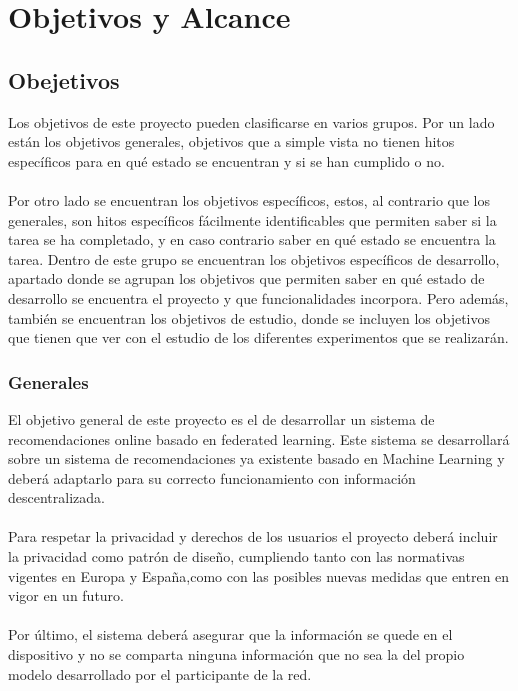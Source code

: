 \chapter{Objetivos y Alcance}
\thispagestyle{fancy}
\section{Obejetivos}
Los objetivos de este proyecto pueden clasificarse en varios grupos. Por un lado están los objetivos generales, objetivos que a simple vista no tienen hitos específicos para en qué estado se encuentran y si se han cumplido o no.
\\\\
Por otro lado se encuentran los objetivos específicos, estos, al contrario que los generales, son hitos específicos fácilmente identificables que permiten saber si la tarea se ha completado, y en caso contrario saber en qué estado se encuentra la tarea. Dentro de este grupo se encuentran los objetivos específicos de desarrollo, apartado donde se agrupan los objetivos que permiten saber en qué estado de desarrollo se encuentra el proyecto y que funcionalidades incorpora. Pero además, también se encuentran los objetivos de estudio, donde se incluyen los objetivos que tienen que ver con el estudio de los diferentes experimentos que se realizarán. 

\subsection{Generales}
El objetivo general de este proyecto es el de desarrollar un sistema de recomendaciones online basado en federated learning. Este sistema se desarrollará sobre un sistema de recomendaciones ya existente basado en Machine Learning y deberá adaptarlo para su correcto funcionamiento con información descentralizada.
\\ \\
Para respetar la privacidad y derechos de los usuarios el proyecto deberá incluir la privacidad como patrón de diseño, cumpliendo tanto con las normativas vigentes en Europa y España,como con las posibles nuevas medidas que entren en vigor en un futuro. 
\\ \\
Por último, el sistema deberá asegurar que la información se quede en el dispositivo y no se comparta ninguna información que no sea la del propio modelo desarrollado por el participante de la red.

